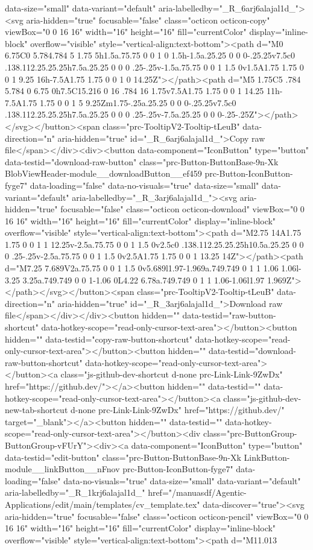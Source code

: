 {{{{{{{data-size="small" data-variant="default" aria-labelledby="_R_6arj6alajal1d_"><svg aria-hidden="true" focusable="false" class="octicon octicon-copy" viewBox="0 0 16 16" width="16" height="16" fill="currentColor" display="inline-block" overflow="visible" style="vertical-align:text-bottom"><path d="M0 6.75C0 5.784.784 5 1.75 5h1.5a.75.75 0 0 1 0 1.5h-1.5a.25.25 0 0 0-.25.25v7.5c0 .138.112.25.25.25h7.5a.25.25 0 0 0 .25-.25v-1.5a.75.75 0 0 1 1.5 0v1.5A1.75 1.75 0 0 1 9.25 16h-7.5A1.75 1.75 0 0 1 0 14.25Z"></path><path d="M5 1.75C5 .784 5.784 0 6.75 0h7.5C15.216 0 16 .784 16 1.75v7.5A1.75 1.75 0 0 1 14.25 11h-7.5A1.75 1.75 0 0 1 5 9.25Zm1.75-.25a.25.25 0 0 0-.25.25v7.5c0 .138.112.25.25.25h7.5a.25.25 0 0 0 .25-.25v-7.5a.25.25 0 0 0-.25-.25Z"></path></svg></button><span class="prc-TooltipV2-Tooltip-tLeuB" data-direction="n" aria-hidden="true" id="_R_6arj6alajal1d_">Copy raw file</span></div><div><button data-component="IconButton" type="button" data-testid="download-raw-button" class="prc-Button-ButtonBase-9n-Xk BlobViewHeader-module__downloadButton__ef459 prc-Button-IconButton-fyge7" data-loading="false" data-no-visuals="true" data-size="small" data-variant="default" aria-labelledby="_R_3arj6alajal1d_"><svg aria-hidden="true" focusable="false" class="octicon octicon-download" viewBox="0 0 16 16" width="16" height="16" fill="currentColor" display="inline-block" overflow="visible" style="vertical-align:text-bottom"><path d="M2.75 14A1.75 1.75 0 0 1 1 12.25v-2.5a.75.75 0 0 1 1.5 0v2.5c0 .138.112.25.25.25h10.5a.25.25 0 0 0 .25-.25v-2.5a.75.75 0 0 1 1.5 0v2.5A1.75 1.75 0 0 1 13.25 14Z"></path><path d="M7.25 7.689V2a.75.75 0 0 1 1.5 0v5.689l1.97-1.969a.749.749 0 1 1 1.06 1.06l-3.25 3.25a.749.749 0 0 1-1.06 0L4.22 6.78a.749.749 0 1 1 1.06-1.06l1.97 1.969Z"></path></svg></button><span class="prc-TooltipV2-Tooltip-tLeuB" data-direction="n" aria-hidden="true" id="_R_3arj6alajal1d_">Download raw file</span></div></div><button hidden="" data-testid="raw-button-shortcut" data-hotkey-scope="read-only-cursor-text-area"></button><button hidden="" data-testid="copy-raw-button-shortcut" data-hotkey-scope="read-only-cursor-text-area"></button><button hidden="" data-testid="download-raw-button-shortcut" data-hotkey-scope="read-only-cursor-text-area"></button><a class="js-github-dev-shortcut d-none prc-Link-Link-9ZwDx" href="https://github.dev/"></a><button hidden="" data-testid="" data-hotkey-scope="read-only-cursor-text-area"></button><a class="js-github-dev-new-tab-shortcut d-none prc-Link-Link-9ZwDx" href="https://github.dev/" target="_blank"></a><button hidden="" data-testid="" data-hotkey-scope="read-only-cursor-text-area"></button><div class="prc-ButtonGroup-ButtonGroup-vFUrY"><div><a data-component="IconButton" type="button" data-testid="edit-button" class="prc-Button-ButtonBase-9n-Xk LinkButton-module__linkButton__nFnov prc-Button-IconButton-fyge7" data-loading="false" data-no-visuals="true" data-size="small" data-variant="default" aria-labelledby="_R_1krj6alajal1d_" href="/manuasdf/Agentic-Applications/edit/main/templates/cv_template.tex" data-discover="true"><svg aria-hidden="true" focusable="false" class="octicon octicon-pencil" viewBox="0 0 16 16" width="16" height="16" fill="currentColor" display="inline-block" overflow="visible" style="vertical-align:text-bottom"><path d="M11.013 }}}}}}}
